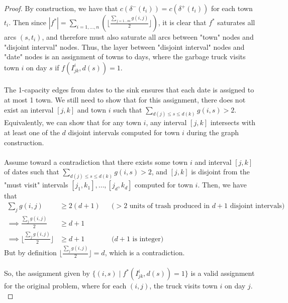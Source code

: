 \documentclass[12pt]{article}
\begin{document}
\begin{proof}
By construction, we have that $c(\delta^-(t_i)) = c(\delta^+(t_i))$ for each town $t_i$. Then since $|f^*| = \sum_{i=1,\dots,n} (\lfloor \frac{\sum_{j = 1\dots m} g(i,j)}{2} \rfloor)$, it is clear that $f^*$ saturates all arcs $(s,t_i)$, and therefore must also saturate all arcs between "town" nodes and "disjoint interval" nodes. Thus, the layer between "disjoint interval" nodes and "date" nodes is an assignment of towns to days, where the garbage truck visits town $i$ on day $s$ if $f(I^i_{jk}, d(s)) = 1$.\\
\\The 1-capacity edges from dates to the sink ensures that each date is assigned to at most 1 town. We still need to show that for this assignment, there does not exist an interval $[j,k]$ and town $i$ such that $\sum_{d(j) \leq s \leq d(k)} g(i,s) > 2$. Equivalently, we can show that for any town $i$, any interval $[j,k]$ intersects with at least one of the $d$ disjoint intervals computed for town $i$ during the graph construction.\\
\\Assume toward a contradiction that there exists some town $i$ and interval $[j,k]$ of dates such that $\sum_{d(j) \leq s \leq d(k)} g(i,s) > 2$, and $[j,k]$ is disjoint from the "must visit" intervals $[j_1,k_1], \dots, [j_d,k_d]$ computed for town $i$. Then, we have that
\begin{equation}
\begin{aligned}
    \sum_j g(i,j) &\geq 2(d+1) && \text{($>2$ units of trash produced in $d+1$ disjoint intervals)}\\
    \implies \frac{\sum_j g(i,j)}{2} &\geq d + 1 \\
    \implies \lfloor \frac{\sum_j g(i,j)}{2} \rfloor &\geq d+1 &&\text{($d+1$ is integer)}
    \end{aligned}
\end{equation}
But by definition $\lfloor \frac{\sum_j g(i,j)}{2} \rfloor = d$, which is a contradiction.\\
\\So, the assignment given by $\{(i,s) \; | \; f^*(I^i_{jk}, d(s)) = 1\}$ is a valid assignment for the original problem, where for each $(i,j)$, the truck visits town $i$ on day $j$.\\

\end{proof}
\end{document}
